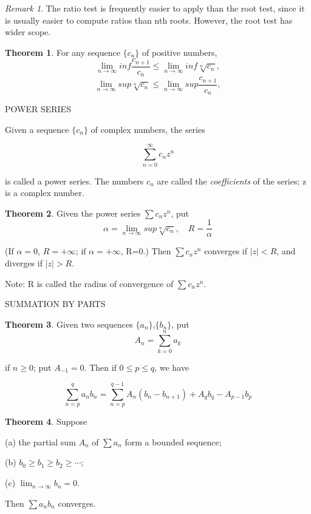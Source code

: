 \documentclass{article}
\theoremstyle{definition}
\newtheorem{theo}{Theorem}
\theoremstyle{remark}
\newtheorem{Rem}{Remark}
\begin{document}
\begin{Rem}
	The ratio test is frequently easier to apply than the root test, since it is usually easier to compute ratios than nth roots. However, the root test has wider scope.
\end{Rem}

\begin{theo}
	For any sequence $\{c_n\}$ of positive numbers,
	\[
	\lim_{n\rightarrow\infty} inf\frac{c_{n+1}}{c_n}\le \lim_{n\rightarrow\infty}inf\sqrt[n]{c_n},
	\]
	\[
	\lim_{n\rightarrow\infty} sup \sqrt[n]{c_n}\le \lim_{n\rightarrow\infty}sup\frac{c_{n+1}}{c_n},
	\]
	
\end{theo}

\newpage

POWER SERIES

Given a sequence $\{c_n\}$ of complex numbers, the series

\[
\sum^\infty_{n=0} c_nz^n
\]

is called a power series. The numbers $c_n$ are called the \textit{coefficients} of the series; z is a complex number.

\begin{theo}
	Given the power series $\sum c_n z^n$, put
	\[
	\alpha=\lim_{n\rightarrow\infty} sup\sqrt[n]{c_n},\quad R=\frac{1}{\alpha}
	\]
	
	(If $\alpha=0$, $R=+\infty$; if $\alpha=+\infty$, R=0.) Then $\sum c_nz^n$ converges if $|z|<R$, and diverges if $|z|>R$.
\end{theo}

Note: R is called the radius of convergence of $\sum c_n z^n.$

\newpage

SUMMATION BY PARTS

\begin{theo}
	Given two sequences $\{a_n\}$,$\{b_n\}$, put
	\[
	A_n=\sum^n_{k=0} a_k
	\]
	
	if $n\ge 0$; put $A_{-1}=0$. Then if $0\le p\le q$, we have
	
	\[
	\sum^q_{n=p}a_n b_n=\sum^{q-1}_{n=p} A_n(b_n-b_{n+1})+A_q b_q-A_{p-1}b_p
	\]	
\end{theo}

\begin{theo}
	Suppose
	
	(a) the partial sum $A_n$ of $\sum a_n$ form a bounded sequence;
	
	(b) $b_0\ge b_1\ge b_2\ge\cdots$;
	
	(c) $\lim_{n\rightarrow\infty} b_n=0$.
	
	Then $\sum a_n b_n$ converges.
\end{theo}
\end{document}
